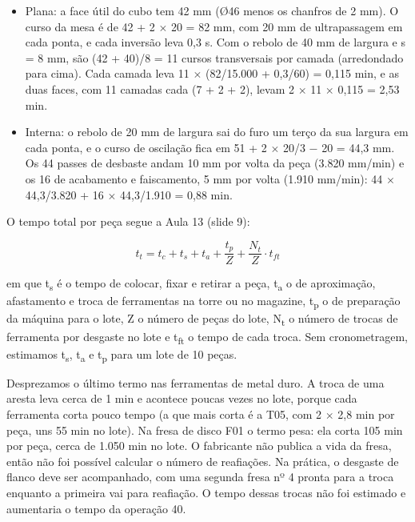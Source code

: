 \begin{itemize}
\item Plana: a face útil do cubo tem 42 mm (Ø46 menos os chanfros de 2 mm). O curso da mesa é de 42 + 2 $\times$ 20 = 82 mm, com 20 mm de ultrapassagem em cada ponta, e cada inversão leva 0,3 s. Com o rebolo de 40 mm de largura e s = 8 mm, são (42 + 40)/8 = 11 cursos transversais por camada (arredondado para cima). Cada camada leva 11 $\times$ (82/15.000 + 0,3/60) = 0,115 min, e as duas faces, com 11 camadas cada (7 + 2 + 2), levam 2 $\times$ 11 $\times$ 0,115 = 2,53 min.
\item Interna: o rebolo de 20 mm de largura sai do furo um terço da sua largura em cada ponta, e o curso de oscilação fica em 51 + 2 $\times$ 20/3 $-$ 20 = 44,3 mm. Os 44 passes de desbaste andam 10 mm por volta da peça (3.820 mm/min) e os 16 de acabamento e faiscamento, 5 mm por volta (1.910 mm/min): 44 $\times$ 44,3/3.820 + 16 $\times$ 44,3/1.910 = 0,88 min.
\end{itemize}

O tempo total por peça segue a Aula 13 (slide 9):

\begin{equation}\label{eq:tt}
  t_{t} = t_{c} + t_{s} + t_{a} + \frac{t_{p}}{Z} + \frac{N_{t}}{Z} \cdot t_{ft}
\end{equation}

em que t\textsubscript{s} é o tempo de colocar, fixar e retirar a peça, t\textsubscript{a} o de aproximação, afastamento e troca de ferramentas na torre ou no magazine, t\textsubscript{p} o de preparação da máquina para o lote, Z o número de peças do lote, N\textsubscript{t} o número de trocas de ferramenta por desgaste no lote e t\textsubscript{ft} o tempo de cada troca. Sem cronometragem, estimamos t\textsubscript{s}, t\textsubscript{a} e t\textsubscript{p} para um lote de 10 peças.

Desprezamos o último termo nas ferramentas de metal duro. A troca de uma aresta leva cerca de 1 min e acontece poucas vezes no lote, porque cada ferramenta corta pouco tempo (a que mais corta é a T05, com 2 $\times$ 2,8 min por peça, uns 55 min no lote). Na fresa de disco F01 o termo pesa: ela corta 105 min por peça, cerca de 1.050 min no lote. O fabricante não publica a vida da fresa, então não foi possível calcular o número de reafiações. Na prática, o desgaste de flanco deve ser acompanhado, com uma segunda fresa nº 4 pronta para a troca enquanto a primeira vai para reafiação. O tempo dessas trocas não foi estimado e aumentaria o tempo da operação 40.

